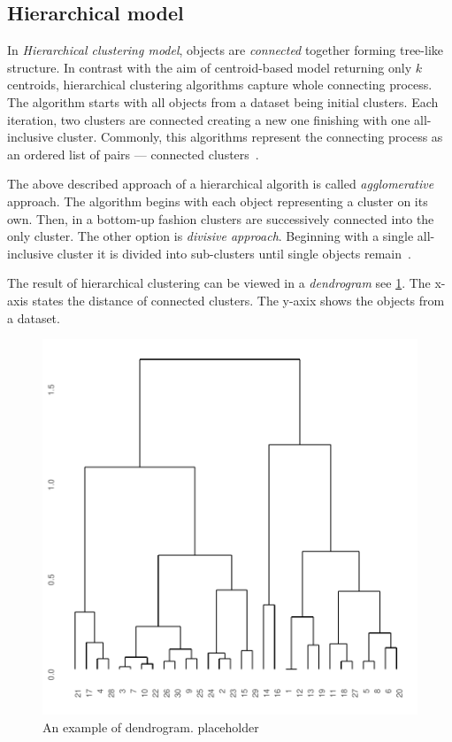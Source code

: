 \subsection{Hierarchical model}

In \emph{Hierarchical clustering model}, objects are \emph{connected} together forming tree-like structure. In contrast with the aim of centroid-based model returning only $k$ centroids, hierarchical clustering algorithms capture whole connecting process. The algorithm starts with all objects from a dataset being initial clusters. Each iteration, two clusters are connected creating a new one finishing with one all-inclusive cluster. Commonly, this algorithms represent the connecting process as an ordered list of pairs --- connected clusters~\cite{karypis1999chameleon}.

The above described approach of a hierarchical algorith is called \emph{agglomerative} approach. The algorithm begins with each object representing a cluster on its own. Then, in a bottom-up fashion clusters are successively connected into the only cluster. The other option is \emph{divisive approach}. Beginning with a single all-inclusive cluster it is divided into sub-clusters until single objects remain~\cite{rokach2005clustering}. 

The result of hierarchical clustering can be viewed in a \emph{dendrogram} see \ref{fig01:dendro}. The x-axis states the distance of connected clusters. The y-axix shows the objects from a dataset.

\begin{figure}\centering
	\includegraphics[width=\linewidth]{img/dendro}
	\caption{An example of dendrogram. placeholder }
	\label{fig01:dendro}
\end{figure}

